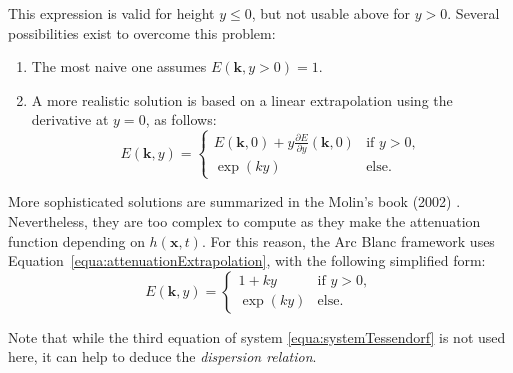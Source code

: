 \documentclass[final]{jcgt}
\def\framework{the Arc Blanc framework\xspace}
\begin{document}
This expression is valid for height $y\leq0$, but not usable above for $y>0$.
Several possibilities exist to overcome this problem:
\begin{enumerate}
	\item The most naive one assumes $E(\mathbf k,y>0)=1$.
	\item A more realistic solution is based on a linear extrapolation using the derivative at $y=0$, as follows:
	      \begin{equation}
		      \label{equa:attenuationExtrapolation}
		      E(\mathbf{k}, y)=
		      \begin{cases}
			      E(\mathbf k,0)+y\frac{\partial E}{\partial y}(\mathbf k,0) & \text{if~}y>0, \\
			      \exp(ky)                                                   & \text{else.}
		      \end{cases}
	      \end{equation}
\end{enumerate}

More sophisticated solutions are summarized in the Molin's book (2002) \cite{molinHydrodynamiqueStructuresOffshore2002}.
Nevertheless, they are too complex to compute as they make the attenuation function depending on $h(\mathbf x,t)$.
For this reason, \framework uses Equation~\ref{equa:attenuationExtrapolation}, with the following simplified form:
\begin{equation}
	\label{equa:attenuationFull}
	E(\mathbf{k}, y)=
	\begin{cases}
		1+ky     & \text{if~}y>0, \\
		\exp(ky) & \text{else.}
	\end{cases}
\end{equation}

Note that while the third equation of system \ref{equa:systemTessendorf} is not used here, it can help to deduce the \emph{dispersion relation}.
\end{document}
